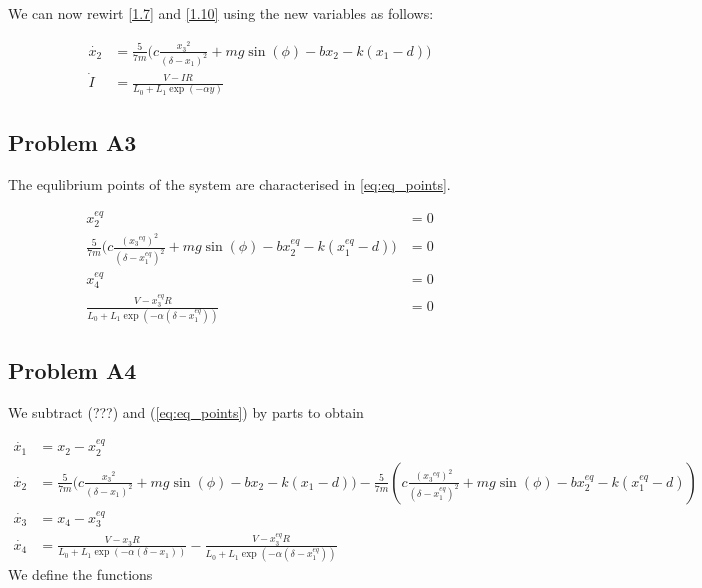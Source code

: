 \documentclass[a4paper,10pt,reqno]{amsart}
\numberwithin{equation}{section}
\begin{document}
\newline We can now rewirt \ref{1.7} and \ref{1.10} using the new variables as follows:

\begin{align}
\dot{x_2} &= \frac{5}{7m}\bigg(c \frac{{x_3}^2}{(\delta - x_1)^2} + mg\sin(\phi) - bx_2 - k(x_1-d)\bigg) \label{1.15} \\
\dot{I} &= \frac{V - IR}{L_0 + L_1\exp(-\alpha y)} \label{1.10}
\end{align}


\subsection{Problem A3}\label{sec:a3}
The equlibrium points of the system are characterised in \ref{eq:eq_points}.

\begin{subequations}\label{eq:eq_points}
\begin{align}
      x^{eq}_{2} &= 0 \\
     \frac{5}{7m}\bigg(c \frac{({x_3}^{eq})^2}{(\delta - x_1^{eq})^2} + mg\sin(\phi) - bx_2^{eq} - k(x_1^{eq}-d)\bigg) &= 0 \\
     x^{eq}_{4} &= 0 \\
     \frac{V - x_3^{eq}R}{L_0 + L_1\exp(-\alpha(\delta - x_1^{eq}))} &= 0
\end{align}
\end{subequations}

\subsection{Problem A4}\label{sec:a4}
We subtract (???) and (\ref{eq:eq_points}) by parts to obtain

\begin{subequations}
     \begin{align}
          \dot{x_1} &= x_2 - x_2^{eq} \\
          \dot{x_2} &=  \frac{5}{7m}\bigg(c \frac{{x_3}^2}{(\delta - x_1)^2} + mg\sin(\phi) - bx_2 - k(x_1-d)\bigg) - \frac{5}{7m}\left(c \frac{({x_3}^{eq})^2}{(\delta - x_1^{eq})^2} + mg\sin(\phi) - bx_2^{eq} - k(x_1^{eq}-d)\right) \label{eq:x2dot}\\
          \dot{x_3} &= x_4 - x_3^{eq} \\
          \dot{x_4} &= \frac{V - x_3R}{L_0 + L_1\exp(-\alpha(\delta - x_1))} - \frac{V - x_3^{eq}R}{L_0 + L_1\exp(-\alpha(\delta - x_1^{eq}))} \label{eq:x4dot}
     \end{align}
\end{subequations}\newline
We define the functions
\end{document}
